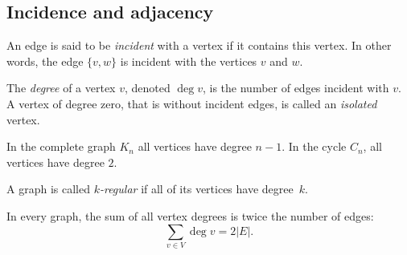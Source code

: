 \begin{page}
\setcounter{section}{1}
\setcounter{subsection}{4}
\setcounter{dfn}{8}
\label{portion:201}

\subsection{Incidence and adjacency}
An edge is said to be \emph{incident} with a vertex if it contains this vertex.
In other words, the edge $\{v, w\}$ is incident with the vertices $v$ and $w$.

The \emph{degree} of a vertex $v$, denoted $\deg v$, is the number of edges incident with $v$.
A vertex of degree zero, that is without incident edges, is called an \emph{isolated} vertex.

In the complete graph $K_n$ all vertices have degree $n-1$.
In the cycle $C_n$, all vertices have degree $2$.


\end{page}

\begin{page}
\setcounter{section}{1}
\setcounter{subsection}{4}
\setcounter{dfn}{9}
\label{portion:203}

\begin{dfn}
A graph is called \emph{$k$-regular} if all of its vertices have degree~$k$.
\end{dfn}

\end{page}

\begin{page}
\setcounter{section}{1}
\setcounter{subsection}{4}
\setcounter{dfn}{9}
\label{portion:204}




\end{page}

\begin{page}
\setcounter{section}{1}
\setcounter{subsection}{4}
\setcounter{dfn}{10}
\label{portion:206}

\begin{thm}
\label{thm:Handshake}
In every graph, the sum of all vertex degrees is twice the number of edges:
\[
\sum_{v \in V} \deg v = 2 |E|.
\]
\end{thm}

\end{page}

